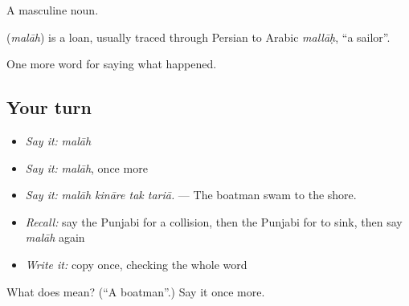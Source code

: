 A masculine noun.

\begin{cousinweb}
\textbf{} (\emph{malāh}) is a loan, usually traced through Persian to Arabic \emph{mallāḥ}, \textquotedblleft{}a sailor\textquotedblright{}.
\end{cousinweb}

\begin{grammarlens}[title={What you've built}]
One more word for saying what happened.
\end{grammarlens}

\subsection*{Your turn}
\begin{itemize}
\raggedright
  \item \emph{Say it:} \emph{malāh}
  \item \emph{Say it:} \emph{malāh}, once more
  \item \emph{Say it:} \emph{malāh kināre tak tariā.} — The boatman swam to the shore.
  \item \emph{Recall:} say the Punjabi for a collision, then the Punjabi for to sink, then say \emph{malāh} again
  \item \emph{Write it:} copy \textbf{} once, checking the whole word
\end{itemize}

\begin{tcolorbox}[breakable,colback=teal!4,colframe=teal!35!black,title={Before you move on}]
What does  mean? (\textquotedblleft{}A boatman\textquotedblright{}.) Say it once more.
\end{tcolorbox}
